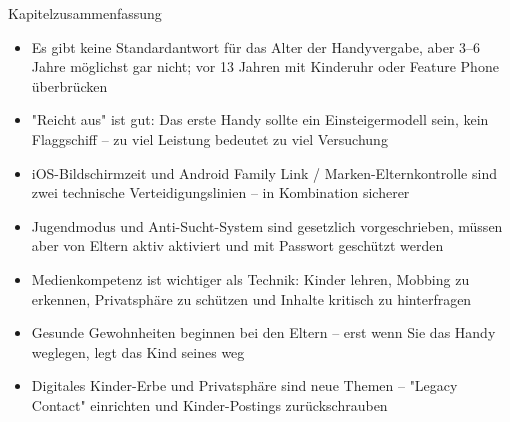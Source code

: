 \begin{tcbsummary}{Kapitelzusammenfassung}
\begin{itemize}
  \item Es gibt keine Standardantwort für das Alter der Handyvergabe, aber 3–6 Jahre möglichst gar nicht; vor 13 Jahren mit Kinderuhr oder Feature Phone überbrücken
  \item "Reicht aus" ist gut: Das erste Handy sollte ein Einsteigermodell sein, kein Flaggschiff – zu viel Leistung bedeutet zu viel Versuchung
  \item iOS-Bildschirmzeit und Android Family Link / Marken-Elternkontrolle sind zwei technische Verteidigungslinien – in Kombination sicherer
  \item Jugendmodus und Anti-Sucht-System sind gesetzlich vorgeschrieben, müssen aber von Eltern aktiv aktiviert und mit Passwort geschützt werden
  \item Medienkompetenz ist wichtiger als Technik: Kinder lehren, Mobbing zu erkennen, Privatsphäre zu schützen und Inhalte kritisch zu hinterfragen
  \item Gesunde Gewohnheiten beginnen bei den Eltern – erst wenn Sie das Handy weglegen, legt das Kind seines weg
  \item Digitales Kinder-Erbe und Privatsphäre sind neue Themen – "Legacy Contact" einrichten und Kinder-Postings zurückschrauben
\end{itemize}

\end{tcbsummary}
